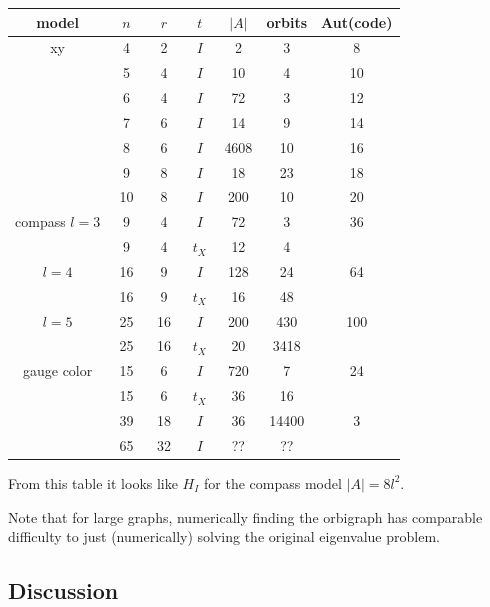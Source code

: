 \documentclass[12pt]{article}
\begin{document}
\begin{center}
\begin{tabular}{ c|c|c|c|c|c|c } 
model &\ $n$\ &\ $r$\ &\ $t$\ & $|A|$ & orbits & Aut(code) \\
\hline
    xy & 4 &  2& $I$ & 2 & 3 & 8 \\
       & 5 &  4& $I$ & 10 & 4 & 10 \\
       & 6 &  4& $I$ & 72 & 3 & 12 \\
       & 7 &  6& $I$ & 14 & 9 & 14 \\
       & 8 &  6& $I$ & 4608 & 10 & 16 \\
       & 9 &  8& $I$ & 18 & 23 & 18  \\
       & 10 & 8& $I$ & 200 & 10 & 20  \\
\hline
    compass $l=3$ & 9 & 4 & $I$ & 72 & 3 & 36 \\
                  & 9 & 4 & $t_X$ & 12 & 4 &  \\
            $l=4$  & 16 & 9  & $I$ & 128 & 24 & 64 \\
                   & 16 & 9  & $t_X$ & 16 & 48 &  \\
            $l=5$  & 25 & 16 & $I$ & 200 & 430 & 100 \\
                   & 25 & 16 & $t_X$ & 20  & 3418 &  \\
\hline
    gauge color & 15 & 6  & $I$ & 720 & 7 & 24  \\
                & 15 & 6  & $t_X$ & 36 & 16 &  \\
                & 39 & 18 & $I$ & 36 & 14400 & 3  \\
                & 65 & 32 & $I$ & ?? & ?? &  \\
\end{tabular}
\end{center}

From this table it looks like $H_I$ for the compass model $|A| = 8l^2.$

Note that for large graphs, numerically finding the orbigraph has comparable
difficulty to just (numerically) solving the original eigenvalue problem.


%
%


\subsection{Discussion}
\end{document}
